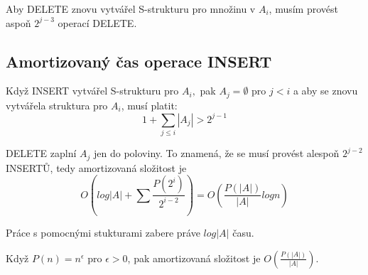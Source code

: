 Aby DELETE znovu vytvářel S-strukturu pro množinu v $A_i$, musím provést
aspoň $2^{j-3}$ operací DELETE.

\subsection{Amortizovaný čas operace INSERT}

Když INSERT vytvářel S-strukturu pro $A_i,$ pak $A_j = \emptyset$ pro
$j<i$ a aby se znovu vytvářela struktura pro $A_i$, musí platit:
$$
1 + \sum_{j \leq i}{} |A_j| > 2^{j-1}
$$

DELETE zaplní $A_j$ jen do poloviny. To znamená, že se musí provést alespoň
$2^{j-2}$ INSERTŮ, tedy amortizovaná složitost je
$$
O(log|A| + \sum_{}{} \frac{P(2^i)}{2^{i-2}}) = O(\frac{P(|A|)}{|A|} log n)
$$

Práce s pomocnými stukturami zabere práve $log|A|$ času.
\par
Když $P(n)=n^{\epsilon}$ pro $\epsilon > 0$, pak amortizovaná složitost je
$O(\frac{P(|A|)}{|A|})$.

